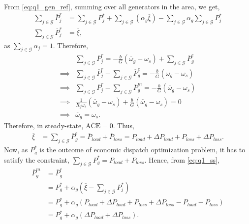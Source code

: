 From \ref{eq:q1_gen_ref}, summing over all generators in the area, we get,
\begin{align*}
	\sum_{j \in \mathcal{G}} \overline{P}_j^r &= \sum_{j \in \mathcal{G}}P_j^* + \sum_{j \in \mathcal{G}} (\alpha_g \overline{\xi}) - \sum_{j\in \mathcal{G}} \alpha_g \sum_{j\in \mathcal{G}}P_j^*\\
	\sum_{j \in \mathcal{G}} \overline{P}_j^r &= \overline{\xi},
\end{align*}
as $\sum_{j \in \mathcal{G}}\alpha_j = 1$. Therefore,
\begin{align*}
	&\sum_{j \in \mathcal{G}} \overline{P}_j^r = -\frac{b}{G}(\overline{\omega}_g-\omega_s)+\sum_{j \in \mathcal{G}}\overline{P}_g^e\\
	\implies & \sum_{j \in \mathcal{G}}\overline{P}_j^r - \sum_{j \in \mathcal{G}}\overline{P}_g^e = -\frac{b}{G}(\overline{\omega}_g-\omega_s)\\
	\implies & \sum_{j \in \mathcal{G}}\overline{P}_j^r - \sum_{j \in \mathcal{G}}\overline{P}_g^m = -\frac{b}{G}(\overline{\omega}_g-\omega_s)\\
	\implies & \frac{1}{R_g \omega_s}(\overline{\omega}_g-\omega_s) + \frac{b}{G}(\overline{\omega}_g-\omega_s) = 0\\
	\implies & \overline{\omega}_g = \omega_s.
\end{align*}
Therefore, in steady-state, $\overline{\text{ACE}} = 0$. Thus,
\begin{align*}
	\overline{\xi} &= \sum_{j \in \mathcal{G}} \overline{P}_g^e = \overline{P}_{load}+\overline{P}_{loss} = P_{load}+\Delta P_{load} + P_{loss}+\Delta P_{loss}.
\end{align*}
Now, as $P_g^*$ is the outcome of economic dispatch optimization problem, it has to satisfy the constraint, $\sum_{j \in \mathcal{G}}P_g^* = P_{load}+P_{loss}$. Hence, from \ref*{eq:q1_ss},
\begin{align*}
	\overline{P}_g^m &= \overline{P}_g^r\\
	&= P_{g}^*+\alpha_g \left(\overline{\xi}-\sum_{j \in \mathcal{G}}P_j^*\right)\\
	&= P_{g}^*+\alpha_g \left(P_{load}+\Delta P_{load} + P_{loss}+\Delta P_{loss} - P_{load}-P_{loss}\right)\\
	&= P_{g}^*+\alpha_g \left(\Delta P_{load} + \Delta P_{loss}\right).
\end{align*}
